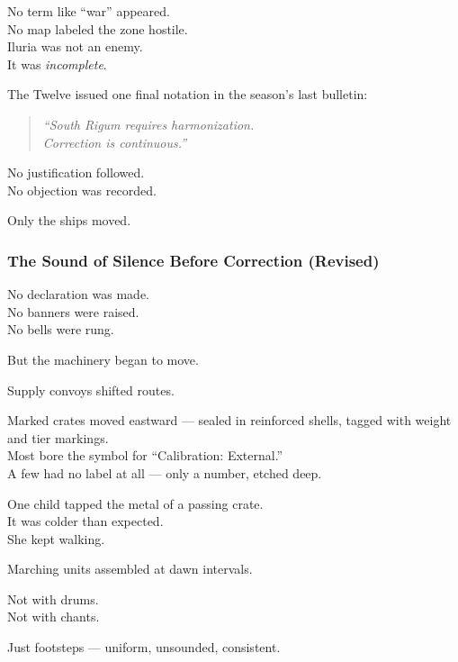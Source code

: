 \documentclass[12pt]{article}
\begin{document}
No term like “war” appeared.\\
No map labeled the zone hostile.\\
Iluria was not an enemy.\\
It was \textit{incomplete}.

\vspace{1em}

The Twelve issued one final notation in the season’s last bulletin:

\begin{quote}
\textit{“South Rigum requires harmonization.}\\
\textit{Correction is continuous.”}
\end{quote}

No justification followed.\\
No objection was recorded.

Only the ships moved.

\dotfill

\subsubsection*{The Sound of Silence Before Correction (Revised)}

No declaration was made.\\
No banners were raised.\\
No bells were rung.

But the machinery began to move.

\vspace{1em}

Supply convoys shifted routes.

Marked crates moved eastward — sealed in reinforced shells, tagged with weight and tier markings.\\
Most bore the symbol for “Calibration: External.”\\
A few had no label at all — only a number, etched deep.

One child tapped the metal of a passing crate.\\
It was colder than expected.\\
She kept walking.

\vspace{1em}

Marching units assembled at dawn intervals.

Not with drums.\\
Not with chants.

Just footsteps — uniform, unsounded, consistent.
\end{document}
